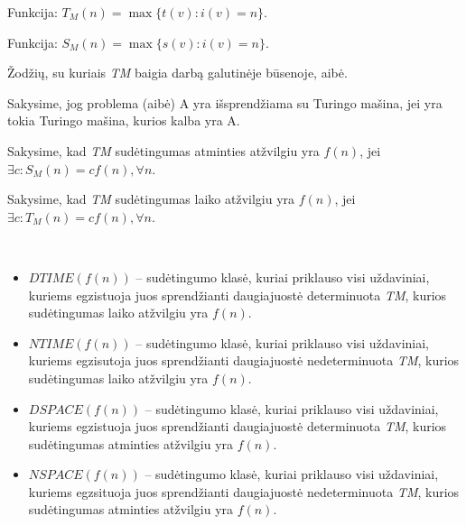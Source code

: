 \begin{defn}
  Funkcija: $T_{M} (n) = \max \{ t(v) : i(v) = n \}$.
\end{defn}

\begin{defn}
  Funkcija: $S_{M} (n) = \max \{ s(v) : i(v) = n \}$.
\end{defn}

\begin{defn}
  Žodžių, su kuriais \emph{TM} baigia darbą galutinėje būsenoje, aibė.
\end{defn}

\begin{defn}
  Sakysime, jog problema (aibė) A yra išsprendžiama su Turingo mašina,
  jei yra tokia Turingo mašina, kurios kalba yra A.
\end{defn}

Sakysime, kad \emph{TM} sudėtingumas atminties atžvilgiu yra 
$f(n)$, jei $\exists c : S_{M}(n) = cf(n), \forall n$.

Sakysime, kad \emph{TM} sudėtingumas laiko atžvilgiu yra 
$f(n)$, jei $\exists c : T_{M}(n) = cf(n), \forall n$.

\begin{defn}
  \hfill \\
  \begin{itemize}
    \item $DTIME(f(n))$ – sudėtingumo klasė, kuriai priklauso visi
      uždaviniai, kuriems egzistuoja juos sprendžianti daugiajuostė 
      determinuota \emph{TM}, kurios sudėtingumas laiko atžvilgiu 
      yra $f(n)$.
    \item $NTIME(f(n))$ – sudėtingumo klasė, kuriai priklauso visi
      uždaviniai, kuriems egzisutoja juos sprendžianti daugiajuostė 
      nedeterminuota \emph{TM}, kurios sudėtingumas laiko atžvilgiu
      yra $f(n)$.
    \item $DSPACE(f(n))$ – sudėtingumo klasė, kuriai priklauso visi
      uždaviniai, kuriems egzistuoja juos sprendžianti daugiajuostė
      determinuota \emph{TM}, kurios sudėtingumas atminties atžvilgiu
      yra $f(n)$.
    \item $NSPACE(f(n))$ – sudėtingumo klasė, kuriai priklauso visi
      uždaviniai, kuriems egzsituoja juos sprendžianti daugiajuostė
      nedeterminuota \emph{TM}, kurios sudėtingumas atminties atžvilgiu
      yra $f(n)$.
  \end{itemize}
\end{defn}

